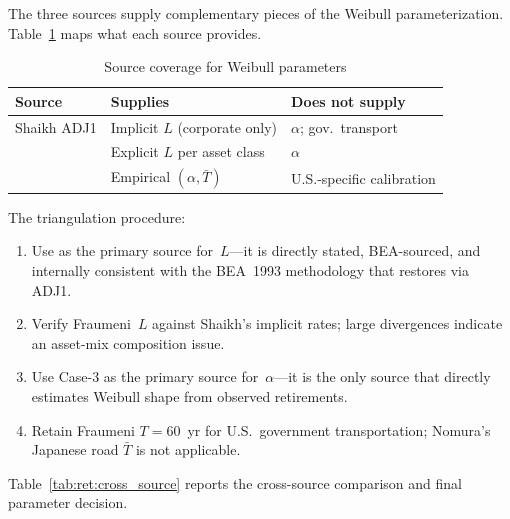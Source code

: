 The three sources supply complementary pieces of the Weibull parameterization.
Table~\ref{tab:ret:source_coverage} maps what each source provides.

\begin{table}[htbp]
\centering
\caption{Source coverage for Weibull parameters}
\label{tab:ret:source_coverage}
\begin{threeparttable}
\begin{tabular}{lll}
\toprule
Source & Supplies & Does not supply \\
\midrule
Shaikh ADJ1                  & Implicit $L$ (corporate only)   & $\alpha$; gov.\ transport \\
\citet[Table~3]{Fraumeni1997} & Explicit $L$ per asset class    & $\alpha$ \\
\citet[Tables~3,~7]{Nomura2005} & Empirical $(\alpha, \bar{T})$ & U.S.-specific calibration \\
\bottomrule
\end{tabular}
\end{threeparttable}
\end{table}

The triangulation procedure:
%
\begin{enumerate}
    \item Use \citet[Table~3]{Fraumeni1997} as the primary source for~$L$---it
    is directly stated, BEA-sourced, and internally consistent with the BEA~1993
    methodology that \citet{Shaikh2016} restores via ADJ1.

    \item Verify Fraumeni~$L$ against Shaikh's implicit rates; large divergences
    indicate an asset-mix composition issue.

    \item Use \citet{Nomura2005} Case-3 as the primary source for~$\alpha$---it
    is the only source that directly estimates Weibull shape from observed
    retirements.

    \item Retain Fraumeni $T = 60$~yr for U.S.\ government transportation;
    Nomura's Japanese road $\bar{T}$ is not applicable.
\end{enumerate}

Table~\ref{tab:ret:cross_source} reports the cross-source comparison and final
parameter decision.

